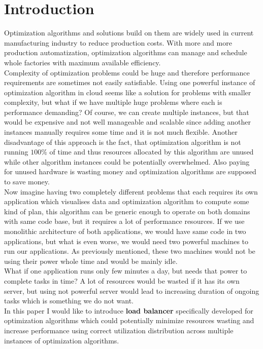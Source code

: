 
\chapter{Introduction}\label{ch:introduction}

Optimization algorithms and solutions build on them are widely used in current manufacturing industry to reduce production costs.
With more and more production automatization, optimization algorithms can manage and schedule whole factories with maximum available efficiency.\\
Complexity of optimization problems could be huge and therefore performance requirements are sometimes not easily satisfiable.
Using one powerful instance of optimization algorithm in cloud seems like a solution for problems with smaller complexity,
but what if we have multiple huge problems where each is performance demanding?
Of course, we can create multiple instances, but that would be expensive and not well manageable and scalable
since adding another instances manually requires some time and it is not much flexible.
Another disadvantage of this approach is the fact, that optimization algorithm is not running $100\%$ of time
and thus resources allocated by this algorithm are unused while other algorithm instances could be potentially overwhelmed.
Also paying for unused hardware is wasting money and optimization algorithms are supposed to save money.\\
Now imagine having two completely different problems that each requires its own application which visualises data
and optimization algorithm to compute some kind of plan,
this algorithm can be generic enough to operate on both domains with same code base, but it requires a lot of performance resources.
If we use monolithic architecture of both applications,
we would have same code in two applications,
but what is even worse, we would need two powerful machines to run our applications.
As previously mentioned, these two machines would not be using their power whole time and would be mainly idle.\\
What if one application runs only few minutes a day, but needs that power to complete tasks in time?
A lot of resources would be wasted if it has its own server,
but using not powerful server would lead to increasing duration of ongoing tasks which is something we do not want.\\
In this paper I would like to introduce \textbf{load balancer} specifically developed for optimization algorithms
which could potentially minimize resources wasting and increase performance using correct utilization distribution across
multiple instances of optimization algorithms.






